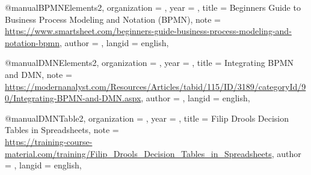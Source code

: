@manual{BPMNElements2,
	organization = {},
	year = {},
	title = {{Beginners Guide to Business Process Modeling and Notation (BPMN)}},
	note = {{\\\url{https://www.smartsheet.com/beginners-guide-business-process-modeling-and-notation-bpmn}}},
	author = {},
	langid = {english},
}

@manual{DMNElements2,
	organization = {},
	year = {},
	title = {{Integrating BPMN and DMN}},
	note = {{\\\url{https://modernanalyst.com/Resources/Articles/tabid/115/ID/3189/categoryId/90/Integrating-BPMN-and-DMN.aspx}}},
	author = {},
	langid = {english},
}

@manual{DMNTable2,
	organization = {},
	year = {},
	title = {{Filip Drools Decision Tables in Spreadsheets}},
	note = {{\\\url{https://training-course-material.com/training/Filip_Drools_Decision_Tables_in_Spreadsheets}}},
	author = {},
	langid = {english},
}
